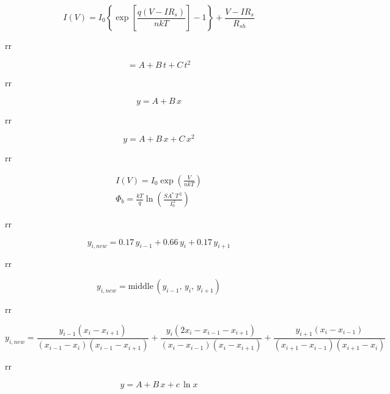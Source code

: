 \documentclass[14pt]{article}
\numberwithin{equation}{part}
\begin{document}
\fontsize{14}{16pt}\selectfont


\renewcommand{\theequation}{\thepart.\arabic{equation}}
\begin{equation*}
    I(V)=I_0\left\{\exp \left[\frac{q(V-IR_s)}{nkT}\right]-1\right\}+\frac{V-IR_s}{R_{sh}}
\end{equation*}

rr

\begin{equation*}
    =A+B\,t+C\,t^2
\end{equation*}

rr

\begin{equation*}
    y =A+B\,x
\end{equation*}

rr

\begin{equation*}
    y =A+B\,x+C\,x^2
\end{equation*}

rr

\begin{eqnarray*}
    I(V) =I_0\exp\left(\frac{V}{nkT}\right)\\
    \Phi_b=\frac{kT}{q}\ln\left(\frac{SA^*\,T^{\,2}}{I_0^{\,2}}\right)
\end{eqnarray*}

rr

\begin{equation*}
    y_{i,new} =0.17\,y_{i-1}+0.66\,y_i+0.17\,y_{i+1}
\end{equation*}

rr

\begin{equation*}
    y_{i,new} =\text{middle}\,(y_{i-1},\,y_i,\,y_{i+1})
\end{equation*}

rr

\begin{equation*}
    y_{i,new} =\frac{y_{i-1}(x_i-x_{i+1})}{(x_{i-1}-x_i)(x_{i-1}-x_{i+1})} +
               \frac{y_{i}(2x_i-x_{i-1}-x_{i+1})}{(x_{i}-x_{i-1})(x_{i}-x_{i+1})}+
               \frac{y_{i+1}(x_i-x_{i-1})}{(x_{i+1}-x_{i-1})(x_{i+1}-x_{i})}
\end{equation*}

rr

\begin{equation*}
    y = A + B\,x+c\,\ln x
\end{equation*}
\end{document}
